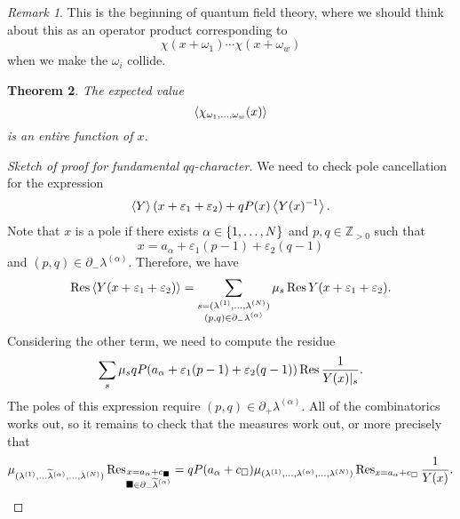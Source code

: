 \documentclass[leqno, openany]{memoir}
\newtheorem{thm}{Theorem}[section]
\theoremstyle{definition}
\theoremstyle{remark}
\newtheorem{rmk}[thm]{Remark}
\theoremstyle{plain}
\theoremstyle{definition}
\theoremstyle{remark}
\newcommand{\Z}{\mathbb{Z}}
\newcommand{\ep}{\varepsilon}
\newcommand{\wt}[1]{\widetilde{#1}}
\begin{document}
\begin{rmk}
    This is the beginning of quantum field theory, where we should think about this as an operator product corresponding to
    \[ \chi(x+\omega_1) \cdots \chi(x+\omega_w) \]
    when we make the $\omega_i$ collide.
\end{rmk}

\begin{thm}
    The expected value
    \[ \ev{\chi_{\omega_1, \ldots, \omega_w}(x)} \]
    is an entire function of $x$.
\end{thm}

\begin{proof}[Sketch of proof for fundamental $qq$-character]
    We need to check pole cancellation for the expression
    \[ \ev{Y}(x+\ep_1+\ep_2) + q P(x) \ev{Y(x)^{-1}}. \]
    Note that $x$ is a pole if there exists $\alpha \in \qty{1, \ldots, N}$ and $p, q \in \Z_{>0}$ such that
    \[ x = a_{\alpha} + \ep_1(p-1) + \ep_2(q-1) \]
    and $(p,q) \in \partial_- \lambda^{(\alpha)}$. Therefore, we have
    \[ \Res \ev{Y(x + \ep_1 + \ep_2)} = \sum_{\substack{ s = (\lambda^{(1)}, \ldots, \lambda^{(N)}) \\ (p,q) \in \partial_- \lambda^{(\alpha)} }} \mu_s \Res Y(x+\ep_1+\ep_2). \]
    Considering the other term, we need to compute the residue
    \[ \sum_s \mu_s q P(a_{\alpha} + \ep_1(p-1) + \ep_2(q-1)) \Res \frac{1}{Y(x)|_s}. \]
    The poles of this expression require $(p,q) \in \partial_+ \lambda^{(\alpha)}$. All of the combinatorics works out, so it remains to check that the measures work out, or more precisely that
    \[ \mu_{(\lambda^{(1)}, \ldots \wt{\lambda}^{(\alpha)}, \ldots, \lambda^{(N)})} \Res_{\substack{x=a_{\alpha} + c_{\blacksquare} \\ \blacksquare \in \partial_- \wt{\lambda}^{(\alpha)}}} = q P(a_{\alpha} + c_{\square}) \mu_{(\lambda^{(1)}, \ldots, \lambda^{(\alpha)}, \ldots, \lambda^{(N)})} \Res_{x = a_{\alpha} + c_{\square}} \frac{1}{Y(x)}. \]
\end{proof}
\end{document}
